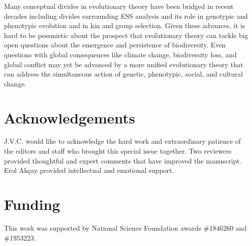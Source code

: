 \documentclass[11pt]{article}
\begin{document}
Many conceptual divides in evolutionary theory have been bridged in recent decades including divides surrounding ESS analysis and its role in genotypic and phenotypic evolution and in kin and group selection. Given these advances, it is hard to be pessmistic about the prospect that evolutionary theory can tackle big open questions about the emergence and persistence of biodiversity. Even questions with global consequences like climate change, biodiversity loss, and global conflict may yet be advanced by a more unified evolutionary theory that can address the simultaneous action of genetic, phenotypic, social, and cultural change.

\section{Acknowledgements}

J.V.C. would like to acknowledge the hard work and extraordinary patience of the editors and staff who brought this special issue together. Two reviewers provided thoughtful and expert comments that have improved the manuscript. Erol Akçay provided intellectual and emotional support.

\section{Funding}

This work was supported by National Science Foundation awards \#1846260 and \#1953223.

\clearpage
\printbibliography
\end{document}
